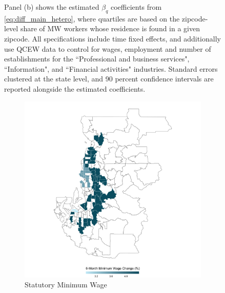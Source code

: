 \begin{figure}[htb!]
\begin{minipage}{\textwidth}
	Panel (b) shows the estimated $\beta_q$ coefficients from \autoref{eq:diff_main_hetero}, where quartiles are 
	based on the zipcode-level share of MW workers whose residence is found in a given zipcode. 
	All specifications include time fixed effects, 
	and additionally use QCEW data to control for wages, employment and number of establishments 
	for the ``Professional and business services", ``Information", and ``Financial activities" industries.
	Standard errors clustered at the state level, and 90 percent confidence intervals are reported alongside 
	the estimated coefficients. 
\end{minipage}
\end{figure}

\begin{figure}\centering
	\captionsetup[subfigure]{justification=centering}
	\caption{Comparison Between Statutory and Experienced Minimum Wage Change for the Seattle MSA}
	\begin{subfigure}[b]{.8\textwidth}
		\centering
		\includegraphics[width = \textwidth]{../../analysis/descriptive_maps/output/Seattle_mw_msa.png}
		\caption{Statutory Minimum Wage}
	\end{subfigure}
	\quad 
	\begin{subfigure}[b]{.8\textwidth}
		\centering

\end{subfigure}
\end{figure}
